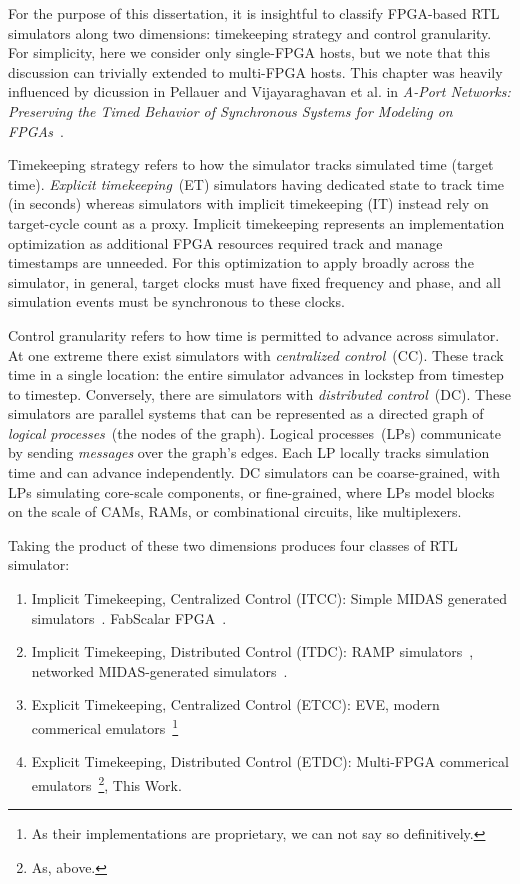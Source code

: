 
For the purpose of this dissertation, it is insightful to classify FPGA-based
RTL simulators along two dimensions: timekeeping strategy and control
granularity. For simplicity, here we consider only single-FPGA hosts, but we
note that this discussion can trivially extended to multi-FPGA hosts. This
chapter was heavily influenced by dicussion in Pellauer and Vijayaraghavan et
al. in \emph{A-Port Networks: Preserving the Timed Behavior of Synchronous
Systems for Modeling on FPGAs}~\cite{APortNetworks}.

Timekeeping strategy refers to how the simulator tracks simulated time (target time). \emph{Explicit timekeeping}~(ET)
simulators having dedicated state to track time (in seconds) whereas simulators with implicit
timekeeping (IT) instead rely on target-cycle count as a proxy. Implicit timekeeping represents an
implementation optimization as additional FPGA resources required track and
manage timestamps are unneeded. For this optimization to apply broadly across
the simulator, in general, target clocks must have fixed frequency and phase, and
all simulation events must be synchronous to these clocks.

Control granularity refers to how time is permitted to advance across simulator. At one extreme there exist
simulators with \emph{centralized control}~(CC). These track time in
a single location: the entire simulator advances in lockstep from
timestep to timestep.  Conversely, there are simulators with \emph{distributed
control}~(DC). These simulators are parallel systems that can be represented as a directed graph of \emph{logical
processes}~(the nodes of the graph). Logical processes~(LPs) communicate by sending \emph{messages} over the graph's edges.
Each LP locally tracks simulation time and can advance independently. DC
simulators can be coarse-grained, with LPs simulating core-scale components, or
fine-grained, where LPs model blocks on the scale of CAMs, RAMs, or
combinational circuits, like multiplexers.

Taking the product of these two dimensions produces four classes of RTL simulator:

\begin{enumerate}
\item{Implicit Timekeeping, Centralized Control (ITCC)}: Simple MIDAS generated simulators~\cite{MIDAS}. FabScalar FPGA~\cite{fabscalarfpga}.

\item{Implicit Timekeeping, Distributed Control (ITDC)}: RAMP simulators~\cite{RAMPGold, HASim}, networked MIDAS-generated simulators~\cite{FireSim}.

\item{Explicit Timekeeping, Centralized Control (ETCC)}: EVE\cite{EVE}, modern commerical emulators~\footnote{As their implementations are proprietary, we can not say so definitively.}

\item{Explicit Timekeeping, Distributed Control (ETDC)}: Multi-FPGA commerical emulators~\footnote{As, above.}, This Work.
\end{enumerate}

